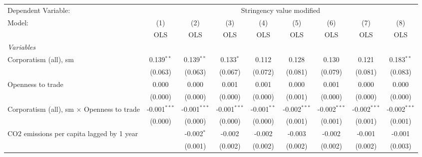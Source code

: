 
\begingroup
\centering
\begin{tabular}{lcccccccc}
   \toprule
   Dependent Variable: & \multicolumn{8}{c}{Stringency value modified}\\
   Model:                                                     & (1)            & (2)            & (3)            & (4)           & (5)            & (6)            & (7)            & (8)\\  
                                                              &  OLS           & OLS            & OLS            & OLS           & OLS            & OLS            & OLS            & OLS\\  
   \midrule
   \emph{Variables}\\
   Corporatism (all), sm                                      & 0.139$^{**}$   & 0.139$^{**}$   & 0.133$^{*}$    & 0.112         & 0.128          & 0.130          & 0.121          & 0.183$^{**}$\\   
                                                              & (0.063)        & (0.063)        & (0.067)        & (0.072)       & (0.081)        & (0.079)        & (0.081)        & (0.083)\\   
   Openness to trade                                          & 0.000          & 0.000          & 0.001          & 0.001         & 0.000          & 0.001          & 0.000          & 0.000\\   
                                                              & (0.000)        & (0.000)        & (0.000)        & (0.000)       & (0.001)        & (0.000)        & (0.000)        & (0.000)\\   
   Corporatism (all), sm $\times$ Openness to trade           & -0.001$^{***}$ & -0.001$^{***}$ & -0.001$^{***}$ & -0.001$^{**}$ & -0.002$^{***}$ & -0.002$^{***}$ & -0.002$^{***}$ & -0.002$^{***}$\\   
                                                              & (0.000)        & (0.000)        & (0.000)        & (0.000)       & (0.001)        & (0.001)        & (0.001)        & (0.001)\\   
   CO2 emissions per capita lagged by 1 year                  &                & -0.002$^{*}$   & -0.002         & -0.002        & -0.003         & -0.002         & -0.001         & -0.001\\   
                                                              &                & (0.001)        & (0.002)        & (0.002)       & (0.002)        & (0.002)        & (0.002)        & (0.003)\\   

\end{tabular}
